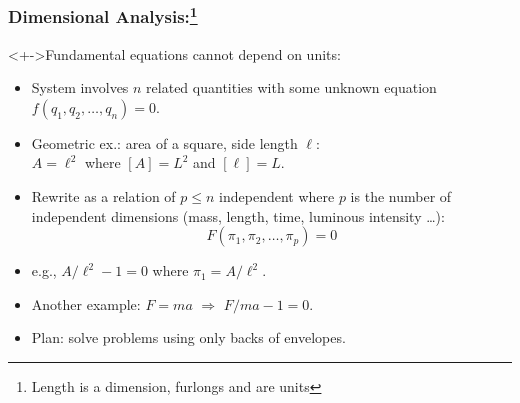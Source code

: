 \begin{frame}
  \small
  \frametitle{Dimensional Analysis:\footnote{Length is a dimension,
      furlongs and  are units}}

  \begin{block}<+->{Fundamental equations cannot depend on units:}
    \begin{itemize}
    \item<+-> 
      System involves $n$ related quantities with some unknown equation $f(q_1, q_2, \ldots, q_n) = 0$.
    \item<+-> 
      Geometric ex.: area of a square, side length $\ell$:\\ 
      $A = \ell^2$ where $[A] = L^2$ and $[\ell] = L$.
    \item<+-> 
      Rewrite as a relation of $p \le n$ independent
      where $p$ is the number of independent dimensions (mass, length,
      time, luminous intensity \ldots):
      $$
      F(\pi_1,\pi_2, \ldots, \pi_p) = 0
      $$
    \item<+-> 
      e.g., $A/\ell^2 - 1 = 0$ where $\pi_1 = A/\ell^2$.
    \item<+-> 
      Another example: $F = ma$ $\Rightarrow$ $F/ma - 1 = 0$.
    \item<+-> 
      Plan: solve problems using only backs of envelopes.
    \end{itemize}

  \end{block}
\end{frame}


